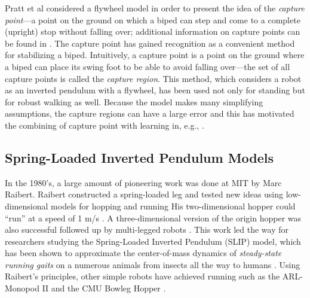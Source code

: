 
%
Pratt et al \cite{Pratt2006} considered a flywheel model in order to present the
idea of the {\em capture point}---a point on the ground on which a biped can
step and come to a complete (upright) stop without falling over;
%
additional information on capture points can be found in \cite{Koolen2012,
  Pratt2012}.
%
The capture point \cite{Pratt2006a} has gained recognition as a convenient
method for stabilizing a biped.
%
Intuitively, a capture point is a point on the ground where a biped can place
its swing foot to be able to avoid falling over---the set of all capture points
is called the {\em capture region}.
%
This method, which considers a robot as an inverted pendulum with a flywheel,
has been used not only for standing but for robust walking as well.
%
Because the model makes many simplifying assumptions, the capture regions can
have a large error and this has motivated the combining of capture point with
learning in, e.g., \cite{Rebula2007}.

\subsection{Spring-Loaded Inverted Pendulum Models}

In the 1980's, a large amount of pioneering work was done at MIT by Marc
Raibert.
%
Raibert constructed a spring-loaded leg and tested new ideas using
low-dimensional models for hopping and running
%
His two-dimensional hopper could ``run'' at a speed of 1 m/s
\cite{Raibert1984, Raibert1986, Raibert1984a}.
%
A three-dimensional version of the origin hopper was also successful
\cite[Chap.~3]{Raibert1986} followed up by multi-legged robots
\cite{Hodgins1991, Raibert1990, Raibert1986a}.
%
This work led the way for researchers studying the Spring-Loaded Inverted
Pendulum (SLIP) model, which has been shown to approximate the center-of-mass
dynamics of \textit{steady-state running gaits} on a numerous animals from
insects all the way to humans \cite{Blickhan1989, Mcmahon1990, Farley1993,
  Full2000, Dickinson2000, Seyfarth2002}.
%
Using Raibert's principles, other simple robots have achieved running such as
the ARL-Monopod II \cite{Ahmadi2006} and the CMU Bowleg Hopper
\cite{Zeglin1998}.
%


